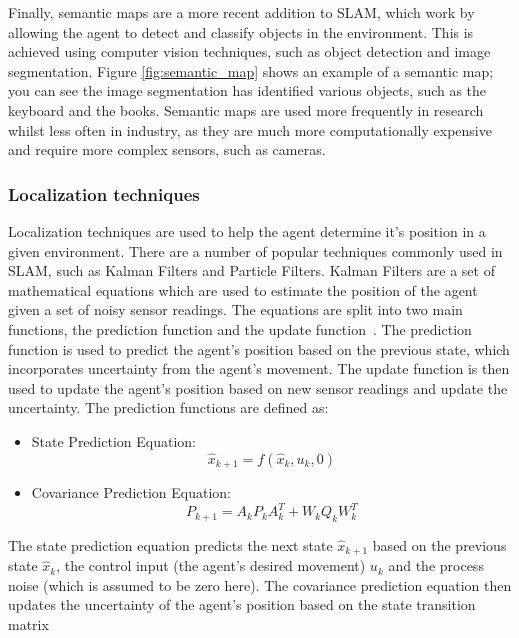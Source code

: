 \documentclass[12pt]{article}
\begin{document}
Finally, semantic maps are a more recent addition to SLAM, which work by allowing the agent to detect and classify objects in the environment.
This is achieved using computer vision techniques, such as object detection and image segmentation.
Figure \ref{fig:semantic_map} shows an example of a semantic map; you can see the image segmentation has identified various objects, such
as the keyboard and the books.
Semantic maps are used more frequently in research whilst less often in industry, as they are much more computationally expensive and
require more complex sensors, such as cameras.\\

\subsubsection{Localization techniques}
Localization techniques are used to help the agent determine it's position in a given environment.
There are a number of popular techniques commonly used in SLAM, such as Kalman Filters and Particle Filters.
Kalman Filters are a set of mathematical equations which are used to estimate the position of the agent given a set of noisy sensor readings.
The equations are split into two main functions, the prediction function and the update function~\cite{intro_to_EKF}.
The prediction function is used to predict the agent's position based on the previous state, which incorporates uncertainty from the agent's movement.
The update function is then used to update the agent's position based on new sensor readings and update the uncertainty.
The prediction functions are defined as:
\begin{itemize}
    \item State Prediction Equation:
    \begin{equation}
        \hat{x}_{k+1} = f(\hat{x}_{k}, u_{k}, 0)
    \end{equation}
    \item Covariance Prediction Equation:
    \begin{equation}
        P_{k+1} = A_{k} P_{k} A_{k}^T + W_{k} Q_{k} W_{k}^T
    \end{equation}
\end{itemize}
The state prediction equation predicts the next state \(\hat{x}_{k+1}\) based on the previous state \(\hat{x}_{k}\), the
control input (the agent's desired movement) \(u_{k}\) and the process noise (which is assumed to be zero here).
The covariance prediction equation then updates the uncertainty of the agent's position based on the state transition matrix
\end{document}
